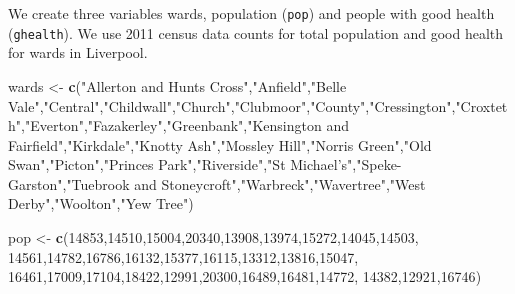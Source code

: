 \documentclass[
]{book}
\newenvironment{Shaded}{\begin{snugshade}}{\end{snugshade}}
\newcommand{\DecValTok}[1]{\textcolor[rgb]{0.00,0.00,0.81}{#1}}
\newcommand{\KeywordTok}[1]{\textcolor[rgb]{0.13,0.29,0.53}{\textbf{#1}}}
\newcommand{\NormalTok}[1]{#1}
\newcommand{\StringTok}[1]{\textcolor[rgb]{0.31,0.60,0.02}{#1}}
\begin{document}
We create three variables wards, population (\texttt{pop}) and people with good health (\texttt{ghealth}). We use 2011 census data counts for total population and good health for wards in Liverpool.

\begin{Shaded}
\begin{Highlighting}[]
\NormalTok{wards <-}\StringTok{ }\KeywordTok{c}\NormalTok{(}\StringTok{"Allerton and Hunts Cross"}\NormalTok{,}\StringTok{"Anfield"}\NormalTok{,}\StringTok{"Belle Vale"}\NormalTok{,}\StringTok{"Central"}\NormalTok{,}\StringTok{"Childwall"}\NormalTok{,}\StringTok{"Church"}\NormalTok{,}\StringTok{"Clubmoor"}\NormalTok{,}\StringTok{"County"}\NormalTok{,}\StringTok{"Cressington"}\NormalTok{,}\StringTok{"Croxteth"}\NormalTok{,}\StringTok{"Everton"}\NormalTok{,}\StringTok{"Fazakerley"}\NormalTok{,}\StringTok{"Greenbank"}\NormalTok{,}\StringTok{"Kensington and Fairfield"}\NormalTok{,}\StringTok{"Kirkdale"}\NormalTok{,}\StringTok{"Knotty Ash"}\NormalTok{,}\StringTok{"Mossley Hill"}\NormalTok{,}\StringTok{"Norris Green"}\NormalTok{,}\StringTok{"Old Swan"}\NormalTok{,}\StringTok{"Picton"}\NormalTok{,}\StringTok{"Princes Park"}\NormalTok{,}\StringTok{"Riverside"}\NormalTok{,}\StringTok{"St Michael's"}\NormalTok{,}\StringTok{"Speke-Garston"}\NormalTok{,}\StringTok{"Tuebrook and Stoneycroft"}\NormalTok{,}\StringTok{"Warbreck"}\NormalTok{,}\StringTok{"Wavertree"}\NormalTok{,}\StringTok{"West Derby"}\NormalTok{,}\StringTok{"Woolton"}\NormalTok{,}\StringTok{"Yew Tree"}\NormalTok{)}

\NormalTok{pop <-}\StringTok{ }\KeywordTok{c}\NormalTok{(}\DecValTok{14853}\NormalTok{,}\DecValTok{14510}\NormalTok{,}\DecValTok{15004}\NormalTok{,}\DecValTok{20340}\NormalTok{,}\DecValTok{13908}\NormalTok{,}\DecValTok{13974}\NormalTok{,}\DecValTok{15272}\NormalTok{,}\DecValTok{14045}\NormalTok{,}\DecValTok{14503}\NormalTok{,}
                \DecValTok{14561}\NormalTok{,}\DecValTok{14782}\NormalTok{,}\DecValTok{16786}\NormalTok{,}\DecValTok{16132}\NormalTok{,}\DecValTok{15377}\NormalTok{,}\DecValTok{16115}\NormalTok{,}\DecValTok{13312}\NormalTok{,}\DecValTok{13816}\NormalTok{,}\DecValTok{15047}\NormalTok{,}
                \DecValTok{16461}\NormalTok{,}\DecValTok{17009}\NormalTok{,}\DecValTok{17104}\NormalTok{,}\DecValTok{18422}\NormalTok{,}\DecValTok{12991}\NormalTok{,}\DecValTok{20300}\NormalTok{,}\DecValTok{16489}\NormalTok{,}\DecValTok{16481}\NormalTok{,}\DecValTok{14772}\NormalTok{,}
                \DecValTok{14382}\NormalTok{,}\DecValTok{12921}\NormalTok{,}\DecValTok{16746}\NormalTok{)}


\end{Highlighting}
\end{Shaded}
\end{document}
